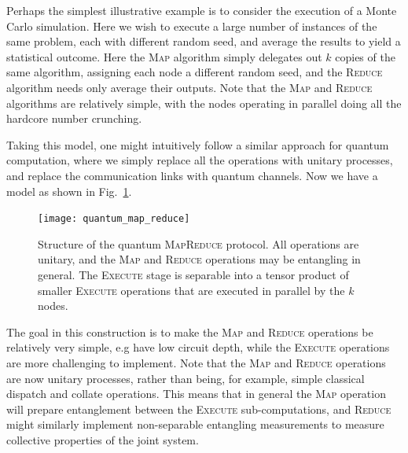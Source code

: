 Perhaps the simplest illustrative example is to consider the execution of a Monte Carlo simulation. Here we wish to execute a large number of instances of the same problem, each with different random seed, and average the results to yield a statistical outcome. Here the \textsc{Map} algorithm simply delegates out $k$ copies of the same algorithm, assigning each node a different random seed, and the \textsc{Reduce} algorithm needs only average their outputs. Note that the \textsc{Map} and \textsc{Reduce} algorithms are relatively simple, with the nodes operating in parallel doing all the hardcore number crunching.

Taking this model, one might intuitively follow a similar approach for quantum computation, where we simply replace all the operations with unitary processes, and replace the communication links with quantum channels. Now we have a model as shown in Fig.~\ref{fig:quant_map_red}.

\begin{figure}
\texttt{[image: quantum\_map\_reduce]}
\captionspace \caption{Structure of the quantum \textsc{MapReduce} protocol. All operations are unitary, and the \textsc{Map} and \textsc{Reduce} operations may be entangling in general. The \textsc{Execute} stage is separable into a tensor product of smaller \textsc{Execute} operations that are executed in parallel by the $k$ nodes.}\label{fig:quant_map_red}	
\end{figure}

The goal in this construction is to make the \textsc{Map} and \textsc{Reduce} operations be relatively very simple, e.g have low circuit depth, while the \textsc{Execute} operations are more challenging to implement. Note that the \textsc{Map} and \textsc{Reduce} operations are now unitary processes, rather than being, for example, simple classical dispatch and collate operations. This means that in general the \textsc{Map} operation will prepare entanglement between the \textsc{Execute} sub-computations, and \textsc{Reduce} might similarly implement non-separable entangling measurements to measure collective properties of the joint system.

